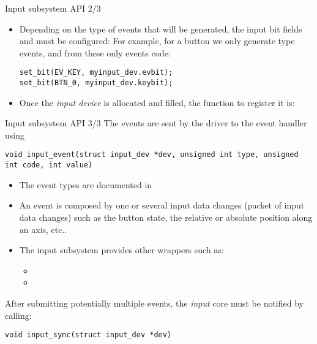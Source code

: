 \begin{frame}[fragile]{Input subsystem API 2/3}
  \begin{itemize}
  \item Depending on the type of events that will be generated, the
    input bit fields  and  must be configured:
    For example, for a button we only generate
     type events, and from these only  events
    code:
    \begin{block}{}
    \begin{verbatim}
set_bit(EV_KEY, myinput_dev.evbit);
set_bit(BTN_0, myinput_dev.keybit);
    \end{verbatim}
    \end{block}
  \item Once the {\em input device} is allocated and filled, the
    function to register it
    is: 
  \end{itemize}
\end{frame}

\begin{frame}[fragile]{Input subsystem API 3/3}
  The events are sent by the driver to the event handler using
  \begin{verbatim}
void input_event(struct input_dev *dev, unsigned int type, unsigned int code, int value)
  \end{verbatim}
  \begin{itemize}
  \item The event types are documented in 
  \item An event is composed by one or several input data changes
    (packet of input data changes) such as the button state, the
    relative or absolute position along an axis, etc..
  \item The input subsystem provides other wrappers such as:
    \begin{itemize}
    \item {}
    \item {}
    \end{itemize}
  \end{itemize}
  After submitting potentially multiple events, the {\em input} core must be
  notified by calling:
  \begin{verbatim}
void input_sync(struct input_dev *dev)
  \end{verbatim}
\end{frame}


